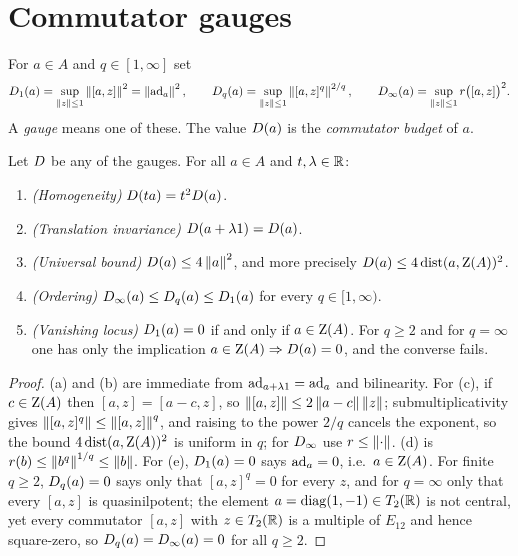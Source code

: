 \section{Commutator gauges}
\label{sec:gauges}

\begin{definition}[Gauges]\label{def:gauges}
For $a\in A$ and $q\in[1,\infty]$ set
\[
  D_1(a)=\sup_{\left\lVert z\right\rVert\le1}\left\lVert[a,z]\right\rVert^2=\left\lVert\operatorname{ad}_a\right\rVert^2,
  \qquad
  D_q(a)=\sup_{\left\lVert z\right\rVert\le1}\left\lVert[a,z]^q\right\rVert^{2/q},
  \qquad
  D_\infty(a)=\sup_{\left\lVert z\right\rVert\le1}r\bigl([a,z]\bigr)^2 .
\]
A \emph{gauge} means one of these.  The value $D(a)$ is the
\emph{commutator budget} of $a$.
\end{definition}

\begin{lemma}\label{lem:gauge-basic}
Let $D$ be any of the gauges.  For all $a\in A$ and $t,\lambda\in\mathbb{R}$:
\begin{enumerate}
\item[(a)] \emph{(Homogeneity)} $D(ta)=t^2D(a)$.
\item[(b)] \emph{(Translation invariance)} $D(a+\lambda1)=D(a)$.
\item[(c)] \emph{(Universal bound)} $D(a)\le4\left\lVert a\right\rVert^2$, and more
  precisely $D(a)\le4\operatorname{dist}(a,\operatorname{Z}(A))^2$.
\item[(d)] \emph{(Ordering)} $D_\infty(a)\le D_q(a)\le D_1(a)$ for
  every $q\in[1,\infty)$.
\item[(e)] \emph{(Vanishing locus)} $D_1(a)=0$ if and only if
  $a\in\operatorname{Z}(A)$.  For $q\ge2$ and for $q=\infty$ one has only the implication
  $a\in\operatorname{Z}(A)\Rightarrow D(a)=0$, and the converse fails.
\end{enumerate}
\end{lemma}

\begin{proof}
(a) and (b) are immediate from $\operatorname{ad}_{a+\lambda1}=\operatorname{ad}_a$ and bilinearity.
For (c), if $c\in\operatorname{Z}(A)$ then $[a,z]=[a-c,z]$, so
$\left\lVert[a,z]\right\rVert\le2\left\lVert a-c\right\rVert\left\lVert z\right\rVert$; submultiplicativity gives
$\left\lVert[a,z]^q\right\rVert\le\left\lVert[a,z]\right\rVert^q$, and raising to the power $2/q$ cancels the
exponent, so the bound $4\operatorname{dist}(a,\operatorname{Z}(A))^2$ is uniform in $q$; for
$D_\infty$ use $r\le\left\lVert\cdot\right\rVert$.  (d) is $r(b)\le\left\lVert b^q\right\rVert^{1/q}\le\left\lVert b\right\rVert$.
For (e), $D_1(a)=0$ says $\operatorname{ad}_a=0$, i.e.\ $a\in\operatorname{Z}(A)$.  For finite
$q\ge2$, $D_q(a)=0$ says only that $[a,z]^q=0$ for every $z$, and for
$q=\infty$ only that every $[a,z]$ is quasinilpotent; the element
$a=\operatorname{diag}(1,-1)\in T_2(\mathbb{R})$ is not central, yet every commutator
$[a,z]$ with $z\in T_2(\mathbb{R})$ is a multiple of $E_{12}$ and hence square-zero, so
$D_q(a)=D_\infty(a)=0$ for all $q\ge2$.
\end{proof}

